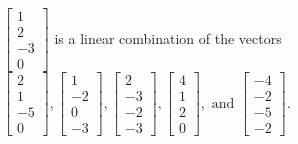 \begin{exercise}
\begin{exerciseStatement}
  \end{exerciseStatement}
  \begin{exerciseAnswer}
   \(\left[\begin{array}{c}
1 \\
2 \\
-3 \\
0
\end{array}\right]\) 
  	 is  
	a linear combination of the vectors \(\left[\begin{array}{c}
2 \\
1 \\
-5 \\
0
\end{array}\right] , \left[\begin{array}{c}
1 \\
-2 \\
0 \\
-3
\end{array}\right] , \left[\begin{array}{c}
2 \\
-3 \\
-2 \\
-3
\end{array}\right] , \left[\begin{array}{c}
4 \\
1 \\
2 \\
0
\end{array}\right] , \text{ and } \left[\begin{array}{c}
-4 \\
-2 \\
-5 \\
-2
\end{array}\right]\).

	
  


  \end{exerciseAnswer}
\end{exercise}